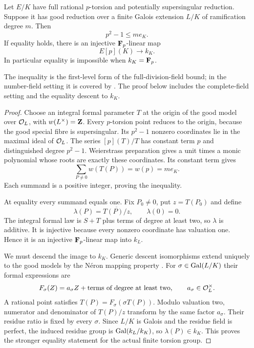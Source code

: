 \begin{lemma}\label{lem:critical-torsion-residue}
Let $E/K$ have full rational $p$-torsion and potentially supersingular reduction. Suppose it has good reduction over a finite Galois extension $L/K$ of ramification degree $m$. Then
\[
                            p^2-1\le me_K.
\]
If equality holds, there is an injective $\mathbf F_p$-linear map
\[
                            E[p](K)\longrightarrow k_K.
\]
In particular equality is impossible when $k_K=\mathbf F_p$.
\end{lemma}
The inequality is the first-level form of the full-division-field bound; in the number-field setting it is covered by \citet[Theorem~1.1, p.~2]{Smith2023}. The proof below includes the complete-field setting and the equality descent to $k_K$.
\begin{proof}
Choose an integral formal parameter $T$ at the origin of the good model over $\mathcal O_L$, with $w(L^\times)=\mathbf Z$. Every $p$-torsion point reduces to the origin, because the good special fibre is supersingular. Its $p^2-1$ nonzero coordinates lie in the maximal ideal of $\mathcal O_L$. The series $[p](T)/T$ has constant term $p$ and distinguished degree $p^2-1$. Weierstrass preparation gives a unit times a monic polynomial whose roots are exactly these coordinates. Its constant term gives
\[
                    \sum_{P\ne0}w(T(P))=w(p)=me_K.
\]
Each summand is a positive integer, proving the inequality.

At equality every summand equals one. Fix $P_0\ne0$, put $z=T(P_0)$ and define
\[
 \lambda(P)=\overline{T(P)/z},\qquad\lambda(0)=0.
\]
The integral formal law is $S+T$ plus terms of degree at least two, so $\lambda$ is additive. It is injective because every nonzero coordinate has valuation one. Hence it is an injective $\mathbf F_p$-linear map into $k_L$.

We must descend the image to $k_K$. Generic descent isomorphisms extend uniquely to the good models by the N\'eron mapping property \citep[Theorem~17.1 and Remark~17.2, p.~70]{Milne2008AV}. For $\sigma\in\operatorname{Gal}(L/K)$ their formal expressions are
\[
 F_\sigma(Z)=a_\sigma Z+\text{terms of degree at least two},
 \qquad a_\sigma\in\mathcal O_L^\times.
\]
A rational point satisfies $T(P)=F_\sigma(\sigma T(P))$. Modulo valuation two, numerator and denominator of $T(P)/z$ transform by the same factor $a_\sigma$. Their residue ratio is fixed by every $\sigma$. Since $L/K$ is Galois and the residue field is perfect, the induced residue group is $\operatorname{Gal}(k_L/k_K)$, so $\lambda(P)\in k_K$. This proves the stronger equality statement for the actual finite torsion group.
\end{proof}

